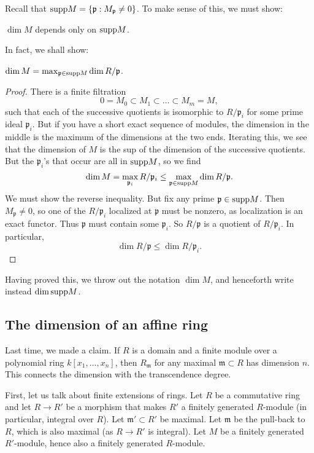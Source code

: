 Recall that $\mathrm{supp} M = \left\{\mathfrak{p}: M_{\mathfrak{p}}\neq 0\right\}$. To
make sense of this, we must show:

\begin{proposition} 
$\dim M$ depends only on $\mathrm{supp} M$.
\end{proposition} 

In fact, we shall show:

\begin{proposition} 
$\dim M = \max_{\mathfrak{p} \in \mathrm{supp} M} \dim R/\mathfrak{p}$.
\end{proposition} 
\begin{proof} 
There is a finite filtration 
\[ 0 = M_0 \subset M_1 \subset \dots \subset M_m = M,  \]
such that each of the successive quotients is isomorphic to $R/\mathfrak{p}_i$
for some prime ideal $\mathfrak{p}_i$. But if you have a short exact sequence
of modules, the dimension in the middle is the maximum of the dimensions at the
two ends. Iterating this, we see that the dimension of $M$ is the sup of the
dimension of the successive quotients. But the $\mathfrak{p}_i$'s that occur
are all in $\mathrm{supp} M$, so we find 
\[ \dim M = \max_{\mathfrak{p}_i} R/\mathfrak{p}_i \leq \max_{\mathfrak{p} \in \mathrm{supp} M} \dim R/\mathfrak{p}.  \]
We must show the reverse inequality. But fix any prime $\mathfrak{p} \in \mathrm{supp}
M$. Then $M_{\mathfrak{p}} \neq 0$, so one of the $R/\mathfrak{p}_i$ localized
at  $\mathfrak{p}$ must be nonzero, as localization is an exact functor. Thus
$\mathfrak{p}$ must contain some $\mathfrak{p}_i$. So $R/\mathfrak{p}$ is a
quotient of $R/\mathfrak{p}_i$. In particular,
\[ \dim R/\mathfrak{p} \leq \dim R/\mathfrak{p}_i.  \]
\end{proof} 

Having proved this, we throw out the notation $\dim M$, and henceforth write
instead $\dim \mathrm{supp} M$.

\subsection{The dimension of an affine ring} Last time, we made a claim. If $R$
is a domain and a finite module over a polynomial ring $k[x_1, \dots, x_n]$,
then $R_{\mathfrak{m}}$ for any maximal $\mathfrak{m} \subset R$ has dimension
$n$. This connects the dimension with the transcendence degree. 

First, let us talk about finite extensions of rings. Let $R$ be a commutative
ring and let $R \to R'$ be a morphism that makes $R'$ a finitely generated $R$-module (in
particular, integral over $R$). Let $\mathfrak{m}' \subset R'$ be maximal. Let
$\mathfrak{m}$ be the pull-back to $R$, which is also maximal (as $R \to R'$ is
integral). 
Let $M$ be a finitely generated $R'$-module, hence also a finitely generated $R$-module. 

